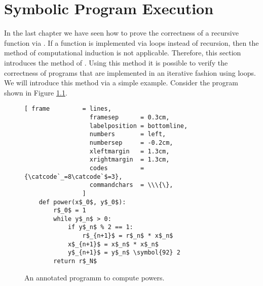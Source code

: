 \chapter{Symbolic Program Execution}
In the last chapter we have seen how to prove the correctness of a recursive function via
.  If a function is implemented via loops instead of recursion, then the method
of computational induction is not applicable.  Therefore, this section introduces the method of
.   Using this method it is possible to verify the
correctness of programs that are implemented in an iterative fashion using loops. 
We will introduce this method via a simple example.  Consider the program shown in Figure
\ref{fig:power-iterative-annotated.stlx}. 

\begin{figure}[!h]
\centering
\begin{Verbatim}[ frame         = lines, 
                  framesep      = 0.3cm, 
                  labelposition = bottomline,
                  numbers       = left,
                  numbersep     = -0.2cm,
                  xleftmargin   = 1.3cm,
                  xrightmargin  = 1.3cm,
                  codes         = {\catcode`_=8\catcode`$=3},
                  commandchars  = \\\{\},
                ]
    def power(x$_0$, y$_0$):
        r$_0$ = 1
        while y$_n$ > 0:
            if y$_n$ % 2 == 1:
                r$_{n+1}$ = r$_n$ * x$_n$
            x$_{n+1}$ = x$_n$ * x$_n$
            y$_{n+1}$ = y$_n$ \symbol{92} 2
        return r$_N$
\end{Verbatim}
\vspace*{-0.3cm}
\caption{An annotated programm to compute powers.}
\label{fig:power-iterative-annotated.stlx}
\end{figure} %

